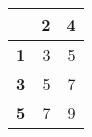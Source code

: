 \begin{tabular}{lrr}
\toprule
{} &  2 &  4 \\
\midrule
\textbf{1} &  3 &  5 \\
\textbf{3} &  5 &  7 \\
\textbf{5} &  7 &  9 \\
\bottomrule
\end{tabular}
